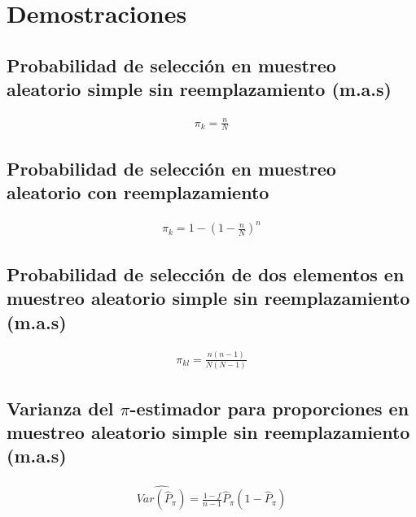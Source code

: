 \documentclass{article}
\begin{document}
	\maketitle
  \thispagestyle{empty}


  \section{Demostraciones}

    \subsection{Probabilidad de selección en muestreo aleatorio simple sin reemplazamiento (m.a.s)}

      \begin{align}
        \pi_k = \frac{n}{N}
      \end{align}

    \subsection{Probabilidad de selección en muestreo aleatorio con reemplazamiento}

      \begin{align}
        \pi_k = 1 - \left(1 - \frac{n}{N}\right)^n
      \end{align}

    \subsection{Probabilidad de selección de dos elementos en muestreo aleatorio simple sin reemplazamiento (m.a.s)}

      \begin{align}
        \pi_{kl} = \frac{n(n-1)}{N(N-1)}
      \end{align}

    \subsection{Varianza del $\pi$-estimador para proporciones en muestreo aleatorio simple sin reemplazamiento (m.a.s)}


      \begin{align}
        \widehat{Var(\widehat{P}_\pi)} = \frac{1-f}{n-1}\widehat{P}_\pi(1-\widehat{P}_\pi)
      \end{align}
\end{document}

